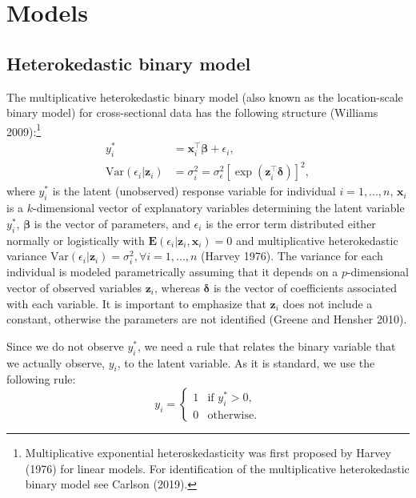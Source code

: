 \hypertarget{models}{%
\section{Models}\label{models}}

\hypertarget{heterokedastic-binary-model}{%
\subsection{Heterokedastic binary model}\label{heterokedastic-binary-model}}

The multiplicative heterokedastic binary model (also known as the location-scale binary model) for cross-sectional data has the following structure (Williams 2009):\footnote{Multiplicative exponential heteroskedasticity was first proposed by Harvey (1976) for linear models. For identification of the multiplicative heterokedastic binary model see Carlson (2019).}
\begin{align}
    y_i^* & = \mathbf x_i^\top \boldsymbol \beta+ \epsilon_i \label{eq:sthet1}, \\
    \textrm{Var}(\epsilon_i| \mathbf z_i) & = \sigma_i^2 = \sigma_{\epsilon}^2\left[\exp\left(\mathbf z_i^\top\boldsymbol \delta\right)\right]^2, 
    \label{eq:sthet2}  
\end{align}
where \(y_i^*\) is the latent (unobserved) response variable for individual \(i = 1,...,n\), \(\mathbf x_i\) is a \(k\)-dimensional vector of explanatory variables determining the latent variable \(y_i^*\), \(\boldsymbol \beta\) is the vector of parameters, and \(\epsilon_i\) is the error term distributed either normally or logistically with \(\mathbf{E}(\epsilon_i|\mathbf z_i, \mathbf x_i) = 0\) and multiplicative heterokedastic variance \(\textrm{Var}(\epsilon_i|\mathbf z_i) = \sigma_i^2 , \forall i = 1,...,n\) (Harvey 1976). The variance for each individual is modeled parametrically assuming that it depends on a \(p\)-dimensional vector of observed variables \(\mathbf z_i\), whereas \(\boldsymbol \delta\) is the vector of coefficients associated with each variable. It is important to emphasize that \(\mathbf z_i\) does not include a constant, otherwise the parameters are not identified (Greene and Hensher 2010).

Since we do not observe \(y_{i}^*\), we need a rule that relates the binary variable that we actually observe, \(y_i\), to the latent variable. As it is standard, we use the following rule:
\begin{equation}
    y_i = \begin{cases}
        1 & \mbox{if $y_i^*> 0$}, \\
        0 & \mbox{otherwise}.
    \end{cases}
    \label{eq:assign} 
\end{equation}


